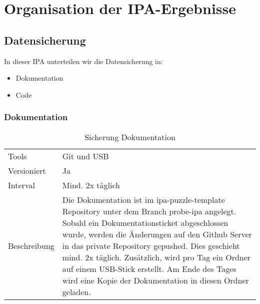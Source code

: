 \chapter{Organisation der IPA-Ergebnisse}

\section{Datensicherung}
In dieser IPA unterteilen wir die Datensicherung in:

\begin{itemize}
\item Dokumentation
\item Code
\end{itemize}

\subsection{Dokumentation}
\begin{table}[h!]
      \begin{tabular}{|L{0.4\textwidth}|L{0.5\textwidth}|}
          \hline
            \\[12pt]
          \hline
          Tools & Git und USB \\
          \hline
          Versioniert & Ja \\
          \hline
          Interval & Mind. 2x täglich \\
          \hline
          Beschreibung & Die Dokumentation ist im ipa-puzzle-template Repository unter dem Branch probe-ipa angelegt.
          Sobald ein Dokumentationsticket abgeschlossen wurde, werden die Änderungen auf den Github Server in das private Repository
          gepushed. Dies geschieht mind. 2x täglich. Zusätzlich, wird pro Tag ein Ordner auf einem USB-Stick erstellt.  Am Ende des Tages wird eine Kopie der Dokumentation
          in diesen Ordner geladen. \\
        \hline
        \end{tabular}
        \caption{Sicherung Dokumentation}
  \end{table}

\newpage

